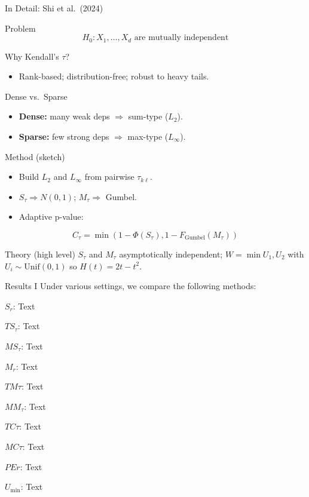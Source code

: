 \documentclass[
  ignorenonframetext,
]{beamer}
\providecommand{\tightlist}{%
  \setlength{\itemsep}{0pt}\setlength{\parskip}{0pt}}
\begin{document}
\begin{frame}[allowframebreaks]{In Detail: Shi et al.~(2024)}
\label{in-detail-shi-et-al.-2024}
\begin{block}{Problem}
\label{problem}
\[
H_0: X_1,\dots,X_d \text{ are mutually independent}
\]
\end{block}

\begin{block}{Why Kendall's \(\tau\)?}
\label{why-kendalls-tau}
\begin{itemize}
\tightlist
\item
  Rank-based; distribution-free; robust to heavy tails.
\end{itemize}
\end{block}

\begin{block}{Dense vs.~Sparse}
\label{dense-vs.-sparse}
\begin{itemize}
\tightlist
\item
  \textbf{Dense:} many weak deps \(\Rightarrow\) sum-type (\(L_2\)).
\item
  \textbf{Sparse:} few strong deps \(\Rightarrow\) max-type
  (\(L_\infty\)).
\end{itemize}
\end{block}

\begin{block}{Method (sketch)}
\label{method-sketch}
\begin{itemize}
\tightlist
\item
  Build \(L_2\) and \(L_\infty\) from pairwise \(\tau_{k\ell}\).
\item
  \(S_\tau \Rightarrow N(0,1)\); \(M_\tau \Rightarrow\) Gumbel.
\item
  Adaptive p-value:
\end{itemize}

\[
C_\tau=\min{(1-\Phi(S_\tau), 1-F_{\mathrm{Gumbel}}(M_\tau))}
\]
\end{block}

\begin{block}{Theory (high level)}
\label{theory-high-level}
\(S_\tau\) and \(M_\tau\) asymptotically independent;
\(W=\min{U_1,U_2}\) with \(U_i\sim \mathrm{Unif}(0,1)\) so
\(H(t)=2t-t^2\).
\end{block}
\end{frame}

\begin{frame}{Results I}
\label{results-i}
Under various settings, we compare the following methods:

\(S_r\): Text

\(TS_{\tau}\): Text

\(MS_{\tau}\): Text

\(M_{r}\): Text

\(TM{\tau}\): Text

\(MM_{\tau}\): Text

\(TC{\tau}\): Text

\(MC{\tau}\): Text

\(PE{r}\): Text

\(U_{\min}\): Text
\end{frame}
\end{document}
